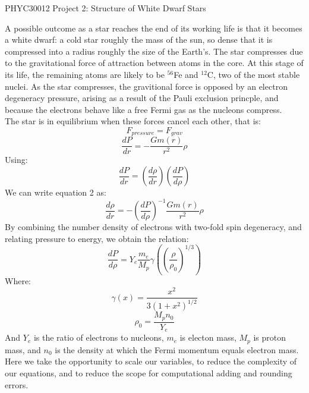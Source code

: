 \documentclass[10pt]{article}
\begin{document}
\begin{center} {\Large PHYC30012 Project 2: Structure of White Dwarf Stars} \end{center}

{\small
\bigskip
A possible outcome as a star reaches the end of its working life is that it becomes a white dwarf: a cold star roughly the mass of the sun, so dense that it is compressed into a radius roughly the size of the Earth's. The star compresses due to the gravitational force of attraction between atoms in the core. At this stage of its life, the remaining atoms are likely to be $^{56}$Fe and $^{12}$C, two of the most stable nuclei. As the star compresses, the gravitional force is opposed by an electron degeneracy pressure, arising as a result of the Pauli exclusion princple, and because the electrons behave like a free Fermi gas as the nucleons compress. \\
The star is in equilibrium when these forces cancel each other, that is:
\begin{equation} F_{pressure} = F_{grav} \end{equation}
\begin{equation} \frac{dP}{dr} = -\frac{Gm(r)}{r^2}\rho \end{equation}
Using: 
\begin{equation} \frac{dP}{dr} = (\frac{d\rho}{dr})(\frac{dP}{d\rho}) \end{equation}
We can write equation 2 as:
\begin{equation} \frac{d\rho}{dr} = -(\frac{dP}{d\rho})^{-1}\frac{Gm(r)}{r^2}\rho \end{equation}
By combining the number density of electrons with two-fold spin degeneracy, and relating pressure to energy, we obtain the relation:
\begin{equation} \frac{dP}{d\rho} = Y_e \frac{m_e}{M_p} \gamma(({\frac{\rho}{\rho_0}})^{1/3}) \end{equation}
Where:
\begin{equation} \gamma(x) = \frac{x^2}{3(1+x^2)^{1/2}} \end{equation}
\begin{equation} \rho_0 = \frac{M_p n_0}{Y_e} \end{equation}
And $Y_e$ is the ratio of electrons to nucleons, $m_e$ is electon mass, $M_p$ is proton mass, and $n_0$ is the density at which the Fermi momentum equals electron mass. \\
Here we take the opportunity to scale our variables, to reduce the complexity of our equations, and to reduce the scope for computational adding and rounding errors.
}
\end{document}
